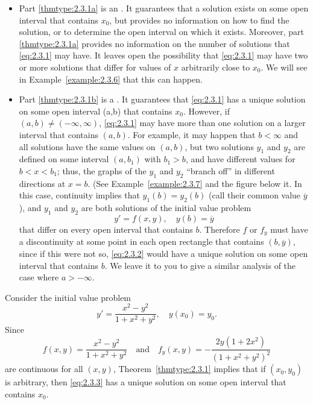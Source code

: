\documentclass{ximera}
\begin{document}
\begin{itemize}
\item
Part \ref{thmtype:2.3.1a} is an . It guarantees that a
solution exists on some open interval that contains $x_0$, but provides
no information on how to find the solution, or to determine the open
interval on which it exists. Moreover, part \ref{thmtype:2.3.1a} provides no
information on the number of solutions that \eqref{eq:2.3.1} may have. It
leaves open the possibility that \eqref{eq:2.3.1} may have two or more
solutions that differ for values of $x$ arbitrarily close to $x_0$. We
will see in Example~\ref{example:2.3.6} that this can happen.
\item
Part \ref{thmtype:2.3.1b} is a . It guarantees that
\eqref{eq:2.3.1} has a unique solution on some open interval (a,b) that
contains $x_0$. However, if $(a,b)\neq(-\infty,\infty)$,
\eqref{eq:2.3.1} may have more than one solution on a larger interval
that contains $(a,b)$. For example, it may happen that $b<\infty$ and all
solutions have the same values on $(a,b)$, but two solutions $y_1$ and
$y_2$ are defined on some interval $(a,b_1)$ with $b_1>b$, and have
different values for $b<x<b_1$;   thus, the graphs of the $y_1$ and
$y_2$ ``branch off'' in different directions at $x=b$. (See
Example~\ref{example:2.3.7} and %
the figure below it.  In this case,
continuity implies that $y_1(b)=y_2(b)$ (call their common value
$\overline y$), and  $y_1$ and $y_2$ are both solutions of the initial
value problem
\begin{equation} \label{eq:2.3.2}
y'=f(x,y),\quad y(b)=\overline y
\end{equation}
that differ on every open interval that contains $b$. Therefore
$f$ or $f_y$ must have a discontinuity at some point in each open
rectangle that contains $(b,\overline y)$, since if this were not so,
\eqref{eq:2.3.2} would have a unique solution on some open interval
that contains $b$. We leave it to you to give a similar analysis of the
case where $a>-\infty$.
 \end{itemize}

\begin{example}\label{example:2.3.1}
Consider the initial value problem
\begin{equation} \label{eq:2.3.3}
y'=\frac{x^2-y^2}{1+x^2+y^2}, \quad y(x_0)=y_0.
\end{equation}
Since
$$
f(x,y)  = \frac{x^2-y^2}{1+x^2+y^2} \quad\mbox{and}\quad 
f_y(x,y)  =  -\frac{2y(1+2x^2)}{(1+x^2+y^2)^2}
$$
are continuous for all $(x,y)$, Theorem~\ref{thmtype:2.3.1} implies that
if $(x_0,y_0)$ is arbitrary, then
\eqref{eq:2.3.3} has a unique solution on some open interval that contains
$x_0$.
\end{example}
\end{document}
